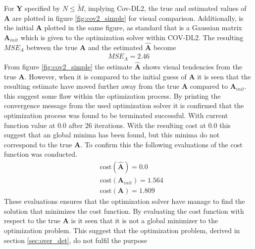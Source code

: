 For $\textbf{Y}$ specified by $N\leq \widetilde{M}$, implying Cov-DL2, the true and estimated values of $\textbf{A}$ are plotted in figure \ref{fig:cov2_simple} for visual comparison. Additionally, is the initial $\textbf{A}$ plotted in the same figure, as standard that is a Gaussian matrix $\textbf{A}_{init}$ which is given to the optimization solver within COV-DL2.    
The resulting $MSE_{A}$ between the true $\textbf{A}$ and the estimated $\hat{\textbf{A}}$ become 
\begin{align*}
MSE_{A} = 2.46 
\end{align*}
From figure \ref{fig:cov2_simple} the estimate $\hat{\textbf{A}}$ shows visual tendencies from the true $\textbf{A}$. However, when it is compared to the initial guess of $\textbf{A}$ it is seen that the resulting estimate have moved further away from the true $\textbf{A}$ compared to $\textbf{A}_{init}$. this suggest some flaw within the optimization process. By printing the convergence message from the used optimization solver it is confirmed that the optimization process was found to be terminated successful. With current function value at $0.0$ after 26 iterations. 
With the resulting cost at 0.0 this suggest that an global minima has been found, but this minima do not correspond to the true $\textbf{A}$.    
To confirm this the following evaluations of the cost function was conducted. 
\begin{align*}
&\text{cost}(\hat{\textbf{A}}) = 0.0\\
&\text{cost}(\textbf{A}_{init}) = 1.564\\
&\text{cost}(\textbf{A}) = 1.809
\end{align*}
These evaluations ensures that the optimization solver have manage to find the solution that minimizes the cost function. By evaluating the cost function with respect to the true $\textbf{A}$ is it seen that it is not a global minimizer to the optimization problem. This suggest that the optimization problem, derived in section \ref{sec:over_det}, do not fulfil the purpose    

